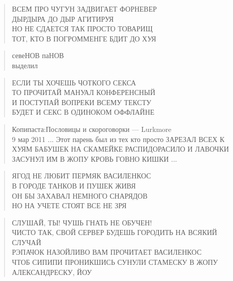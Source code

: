 \poemtitle{***}
\begin{verse}
ВСЕМ ПРО ЧУГУН ЗАДВИГАЕТ ФОРНЕВЕР\\
ДЫРДЫРА ДО ДЫР АГИТИРУЯ\\
НО НЕ СДАЕТСЯ ТАК ПРОСТО ТОВАРИЩ\\
ТОТ, КТО В ПОГРОММЕНГЕ БДИТ ДО ХУЯ
\end{verse}

\poemtitle{***}
\begin{verse}
севеНОВ паНОВ\\
выделил
\end{verse}

\poemtitle{***}
\begin{verse}
ЕСЛИ ТЫ ХОЧЕШЬ ЧОТКОГО СЕКСА\\
ТО ПРОЧИТАЙ МАНУАЛ КОНФЕРЕНСНЫЙ\\
И ПОСТУПАЙ ВОПРЕКИ ВСЕМУ ТЕКСТУ\\
БУДЕТ И СЕКС В ОДИНОКОМ ОФФЛАЙНЕ
\end{verse}

\poemtitle{***}
\begin{verse}
Копипаста:Пословицы и скороговорки — Lurkmore\\
9 мар 2011 ... Этот парень был из тех кто просто ЗАРЕЗАЛ ВСЕХ К ХУЯМ БАБУШЕК НА СКАМЕЙКЕ РАСПИДОРАСИЛО И ЛАВОЧКИ ЗАСУНУЛ ИМ В ЖОПУ КРОВЬ ГОВНО КИШКИ ...
\end{verse}

\poemtitle{***}
\begin{verse}
ЯГОД НЕ ЛЮБИТ ПЕРМЯК ВАСИЛЕНКОС\\
В ГОРОДЕ ТАНКОВ И ПУШЕК ЖИВЯ\\
ОН БЫ ЗАХАВАЛ НЕМНОГО СНАРЯДОВ\\
НО НА УЧЕТЕ СТОЯТ ВСЕ НЕ ЗРЯ
\end{verse}

\poemtitle{***}
\begin{verse}
СЛУШАЙ, ТЫ! ЧУШЬ ГНАТЬ НЕ ОБУЧЕН!\\
ЧИСТО ТАК, СВОЙ СЕРВЕР БУДЕШЬ ГОРОДИТЬ НА ВСЯКИЙ СЛУЧАЙ\\
РЭПАЧОК НАЗОЙЛИВО ВАМ ПРОЧИТАЕТ ВАСИЛЕНКОС\\
ЧТОБ СИПИПИ ПРОНИКШИСЬ СУНУЛИ СТАМЕСКУ В ЖОПУ АЛЕКСАНДРЕСКУ, ЙОУ
\end{verse}

